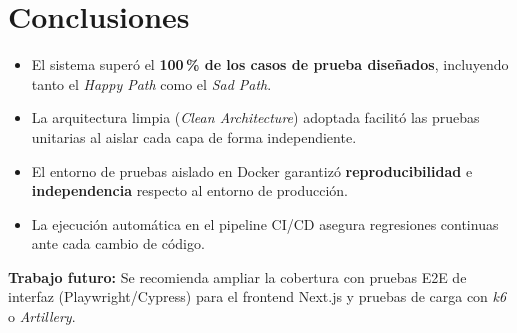 \documentclass[12pt, letterpaper]{article}
\begin{document}
\section{Conclusiones}

\begin{itemize}[leftmargin=1.5em, itemsep=6pt]
  \item El sistema superó el \textbf{100\,\% de los casos de prueba diseñados}, incluyendo
        tanto el \textit{Happy Path} como el \textit{Sad Path}.
  \item La arquitectura limpia (\textit{Clean Architecture}) adoptada facilitó las pruebas
        unitarias al aislar cada capa de forma independiente.
  \item El entorno de pruebas aislado en Docker garantizó \textbf{reproducibilidad} e
        \textbf{independencia} respecto al entorno de producción.
  \item La ejecución automática en el pipeline CI/CD asegura regresiones continuas ante
        cada cambio de código.
\end{itemize}

\begin{warningbox}
  \textbf{Trabajo futuro:} Se recomienda ampliar la cobertura con pruebas E2E de interfaz
  (Playwright/Cypress) para el frontend Next.js y pruebas de carga con \textit{k6} o
  \textit{Artillery}.
\end{warningbox}
\end{document}
